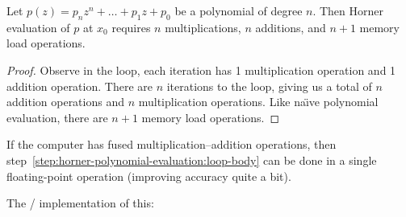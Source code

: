 \begin{thm}
  Let $p(z) = p_{n}z^{n} + \dots + p_{1}z + p_{0}$ be a polynomial of
  degree $n$. Then Horner evaluation of $p$ at $x_{0}$ requires $n$
  multiplications, $n$ additions, and $n+1$ memory load operations.
\end{thm}
\begin{proof}
Observe in the loop, each iteration has 1 multiplication operation and 1
addition operation. There are $n$ iterations to the loop, giving us a
total of $n$ addition operations and $n$ multiplication operations.
Like na\"{\i}ve polynomial evaluation, there are $n+1$ memory load
operations.
\end{proof}
\begin{rmk}
  If the computer has fused multiplication--addition operations, then
  step~\ref{step:horner-polynomial-evaluation:loop-body} can be done in
  a single floating-point operation (improving accuracy quite a bit).
\end{rmk}
\begin{chunk}
  The \FORTRAN/ implementation of this:
  
\end{chunk}
